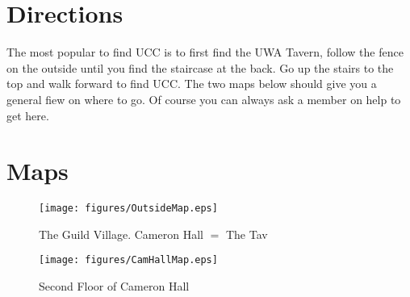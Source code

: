 \label{FindClubroom}


\section{Directions}
	The most popular to find UCC is to first find the UWA Tavern, follow the fence on the outside until you find the staircase at the back. Go up the stairs to the top and walk forward to find UCC. The two maps below should give you a general fiew on where to go. Of course you can always ask a member on help to get here.
\section{Maps}
	\begin{figure}[H]
		\centering
		\texttt{[image: figures/OutsideMap.eps]}
		\caption{The Guild Village. Cameron Hall $=$ The Tav}
		\label{OutsideMap.eps}
	\end{figure}
	\begin{figure}[H]
		\centering
		\texttt{[image: figures/CamHallMap.eps]}
		\caption{Second Floor of Cameron Hall}
		\label{CamHallMap.eps}
	\end{figure}
